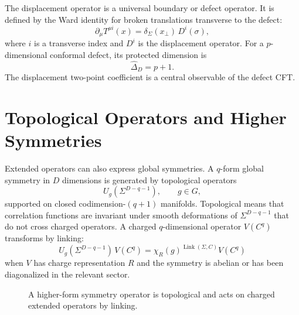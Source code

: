 The displacement operator is a universal boundary or defect operator.  It is
defined by the Ward identity for broken translations transverse to the defect:
\[
  \partial_\mu T^{\mu i}(x)
  =
  \delta_\Sigma(x_\perp)\,D^i(\sigma),
\]
where \(i\) is a transverse index and \(D^i\) is the displacement operator.
For a \(p\)-dimensional conformal defect, its protected dimension is
\[
  \widehat\Delta_D=p+1.
\]
The displacement two-point coefficient is a central observable of the defect
CFT.

\section{Topological Operators and Higher Symmetries}

Extended operators can also express global symmetries.  A \(q\)-form global
symmetry in \(D\) dimensions is generated by topological operators
\[
  U_g(\Sigma^{D-q-1}),
  \qquad
  g\in G,
\]
supported on closed codimension-\((q+1)\) manifolds.  Topological means that
correlation functions are invariant under smooth deformations of
\(\Sigma^{D-q-1}\) that do not cross charged operators.  A charged
\(q\)-dimensional operator \(V(C^q)\) transforms by linking:
\[
  U_g(\Sigma^{D-q-1})\,V(C^q)
  =
  \chi_R(g)^{\operatorname{Link}(\Sigma,C)}
  V(C^q)
\]
when \(V\) has charge representation \(R\) and the symmetry is abelian or has
been diagonalized in the relevant sector.

\begin{figure}[H]
  \centering
  \caption{A higher-form symmetry operator is topological and acts on charged
  extended operators by linking.}
  \label{fig:higher-form-symmetry-linking}
\end{figure}

